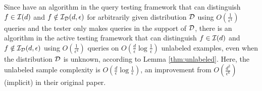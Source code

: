 

Since \citet{BBBY12} have an algorithm in the query testing framework that can distinguish $f\in{\mathcal{I}}(d)$ and $f\notin{\mathcal{I}}_{\mathcal{D}}(d,\epsilon)$ for arbitrarily given distribution ${\mathcal{D}}$ using $O(\frac{1}{\epsilon^4})$ queries and the tester only makes queries in the support of ${\mathcal{D}}$, there is an algorithm in the active testing framework that can distinguish $f\in{\mathcal{I}}(d)$ and $f\notin{\mathcal{I}}_{{\mathcal{D}}}(d,\epsilon)$ using $O(\frac{1}{\epsilon^4})$ queries on $O(\frac{d}{\epsilon}\log\frac{1}{\epsilon})$ unlabeled examples, even when the distribution ${\mathcal{D}}$ is unknown, according to Lemma \ref{thm:unlabeled}. Here, the unlabeled sample complexity is $O(\frac{d}{\epsilon}\log\frac{1}{\epsilon})$, an improvement from $O(\frac{d^2}{\epsilon^6})$ (implicit) in their original paper.

